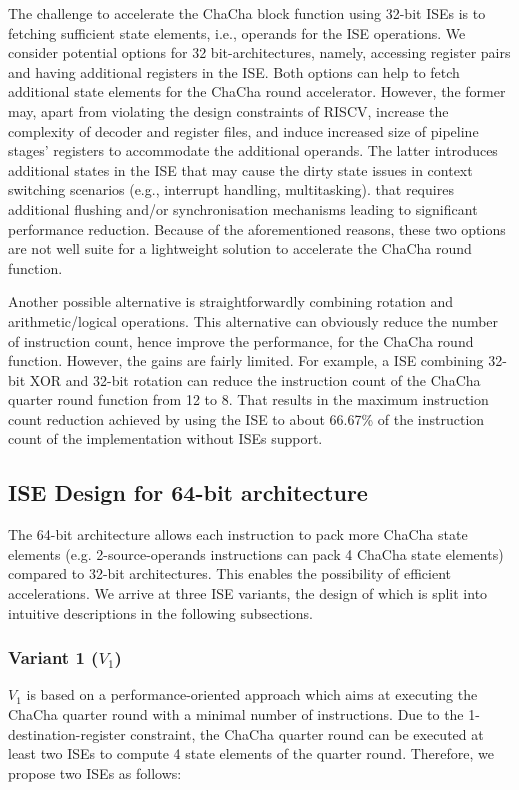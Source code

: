 The challenge to accelerate the ChaCha block function using 32-bit ISEs is to fetching sufficient state elements, i.e., operands for the ISE operations.
We consider potential options for 32 bit-architectures, namely, accessing register pairs and having additional registers in the ISE.
Both options can help to fetch additional state elements for the ChaCha round accelerator. 
However, the former may, apart from violating the design constraints of RISCV, 
increase the complexity of decoder and register files, and 
induce increased size of pipeline stages' registers to accommodate the additional operands.
The latter introduces additional states in the ISE that may cause the dirty state issues in context switching scenarios (e.g., interrupt handling, multitasking).
that requires additional flushing and/or synchronisation mechanisms leading to significant performance reduction.
Because of the aforementioned reasons, these two options are not well suite for a lightweight solution to accelerate the ChaCha round function.

Another possible alternative is straightforwardly combining rotation and arithmetic/logical operations. 
This alternative can obviously reduce the number of instruction count, hence improve the performance, for the ChaCha round function.
However, the gains are fairly limited. 
For example, a ISE combining 32-bit XOR and 32-bit rotation can reduce the instruction count of the ChaCha quarter round function from 
12 to 8. 
That results in the maximum instruction count reduction achieved by using the ISE to about 66.67\% of the instruction count of the implementation without ISEs support.

\subsection{ISE Design for 64-bit architecture}
The 64-bit architecture allows each instruction to pack more ChaCha state elements (e.g. 2-source-operands instructions can pack 4 ChaCha state elements) compared to 32-bit architectures. 
This enables the possibility of efficient accelerations.
We arrive at three ISE variants, the design of which is split into intuitive descriptions in the following subsections. 

\subsubsection{Variant 1 ($V_1$)}
$V_1$ is based on a performance-oriented approach which aims at executing the ChaCha quarter round with a minimal number of instructions.
Due to the 1-destination-register constraint, the ChaCha quarter round can be executed at least two ISEs to compute 4 state elements of the quarter round.
Therefore, we propose two ISEs as follows:

